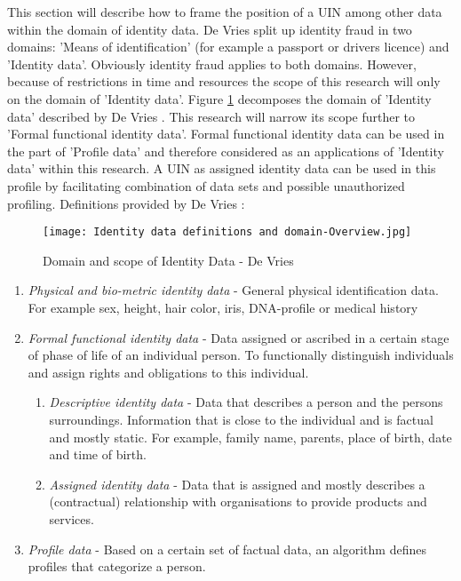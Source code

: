 This section will describe how to frame the position of a UIN among other data within the domain of identity data.
De Vries \etal \cite{Vries2007IdentiteitsfraudeEA} split up identity fraud in two domains: 'Means of identification' (for example a passport or drivers licence) and 'Identity data'. Obviously identity fraud applies to both domains. However, because of restrictions in time and resources the scope of this research will only on the domain of 'Identity data'.
Figure \ref{fig:ID_domain} decomposes the domain of 'Identity data' described by De Vries \etal. This research will narrow its scope further to 'Formal functional identity data'. Formal functional identity data can be used in the part of 'Profile data' and therefore considered as an applications of 'Identity data' within this research.  A UIN as assigned identity data can be used in this profile by facilitating combination of data sets and possible unauthorized profiling. Definitions provided by De Vries \etal: 

    \begin{figure}
        \graphicspath{ {./images/} }
        \texttt{[image: Identity data definitions and domain-Overview.jpg]}\\
        \caption{Domain and scope of Identity Data - De Vries \etal \cite{Vries2007IdentiteitsfraudeEA}}
        \label{fig:ID_domain}
    \end{figure}

\begin{enumerate}
\item \textit{Physical and bio-metric identity data} - General physical identification data. For example sex, height, hair color, iris, DNA-profile or medical history
\item \textit{Formal functional identity data} - Data assigned or ascribed in a certain stage of phase of life of an individual person. To functionally distinguish individuals and assign rights and obligations to this individual.
\begin{enumerate}
\item \textit{Descriptive identity data} - Data that describes a person and the persons surroundings. Information that is close to the individual and is factual and mostly static. For example, family name, parents, place of birth, date and time of birth. 
\item \textit{Assigned identity data} - Data that is assigned and mostly describes a (contractual) relationship with organisations to provide products and services.
\end{enumerate}
\item \textit{Profile data} - Based on a certain set of factual data, an algorithm defines profiles that categorize a person. 
\end{enumerate}

